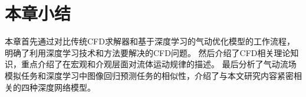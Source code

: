 \section{本章小结}

本章首先通过对比传统CFD求解器和基于深度学习的气动优化模型的工作流程，明确了利用深度学习技术和方法要解决的CFD问题。
然后介绍了CFD相关理论知识，重点介绍了在宏观和介观层面对流体运动规律的描述。
最后分析了气动流场模拟任务和深度学习中图像回归预测任务的相似性，介绍了与本文研究内容紧密相关的四种深度网络模型。





